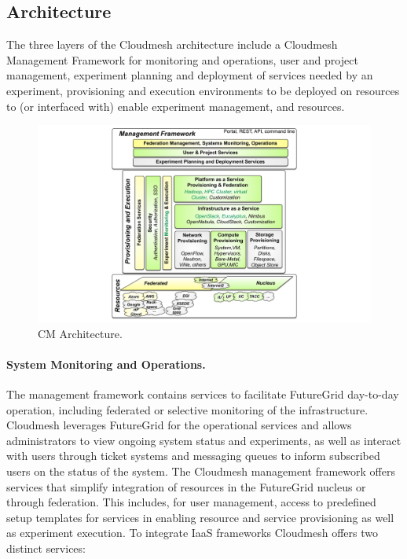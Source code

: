 \documentclass{tex/sig-alternate}
\begin{document}
\subsection{Architecture}


The three layers of the Cloudmesh architecture include a Cloudmesh Management Framework for monitoring and operations, user and project management, experiment planning and deployment of services needed by an experiment, provisioning and execution environments to be deployed on resources to (or interfaced with) enable experiment management, and resources.


\begin{figure}[htb]
  \centering
    \includegraphics[width=1.0\columnwidth]{images/cm-arch.pdf}
  \caption{CM Architecture.}
\end{figure}


\paragraph{System Monitoring and Operations.}


The management framework contains services to facilitate FutureGrid day-to-day operation, including federated or selective monitoring of the infrastructure. Cloudmesh leverages FutureGrid for the operational services and allows administrators to view ongoing system status and experiments, as well as interact with users through ticket systems and messaging queues to inform subscribed users on the status of the system.
The Cloudmesh management framework offers services that simplify integration of resources in the FutureGrid nucleus or through federation. This includes, for user management, access to predefined setup templates for services in enabling resource and service provisioning as well as experiment execution. To integrate IaaS frameworks Cloudmesh offers two distinct services:
\end{document}
